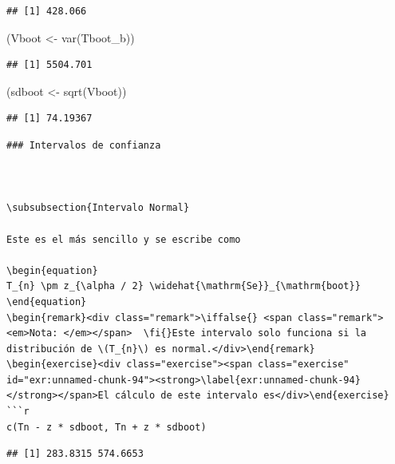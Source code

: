 \documentclass[
  12pt,
]{book}
\newenvironment{Shaded}{\begin{snugshade}}{\end{snugshade}}
\newcommand{\FunctionTok}[1]{\textcolor[rgb]{0.00,0.00,0.00}{#1}}
\newcommand{\NormalTok}[1]{#1}
\newcommand{\OtherTok}[1]{\textcolor[rgb]{0.56,0.35,0.01}{#1}}
\theoremstyle{definition}
\theoremstyle{definition}
\theoremstyle{definition}
\newtheorem{exercise}{Ejercicio}[chapter]
\theoremstyle{remark}
\newtheorem*{remark}{Nota: }
\begin{document}
\begin{verbatim}
## [1] 428.066
\end{verbatim}

\begin{Shaded}
\begin{Highlighting}[]
\NormalTok{(Vboot }\OtherTok{\textless{}{-}} \FunctionTok{var}\NormalTok{(Tboot\_b))}
\end{Highlighting}
\end{Shaded}

\begin{verbatim}
## [1] 5504.701
\end{verbatim}

\begin{Shaded}
\begin{Highlighting}[]
\NormalTok{(sdboot }\OtherTok{\textless{}{-}} \FunctionTok{sqrt}\NormalTok{(Vboot))}
\end{Highlighting}
\end{Shaded}

\begin{verbatim}
## [1] 74.19367
\end{verbatim}

\begin{verbatim}
### Intervalos de confianza



\subsubsection{Intervalo Normal}

Este es el más sencillo y se escribe como

\begin{equation}
T_{n} \pm z_{\alpha / 2} \widehat{\mathrm{Se}}_{\mathrm{boot}}
\end{equation}
\begin{remark}<div class="remark">\iffalse{} <span class="remark"><em>Nota: </em></span>  \fi{}Este intervalo solo funciona si la distribución de \(T_{n}\) es normal.</div>\end{remark}
\begin{exercise}<div class="exercise"><span class="exercise" id="exr:unnamed-chunk-94"><strong>\label{exr:unnamed-chunk-94} </strong></span>El cálculo de este intervalo es</div>\end{exercise}
```r
c(Tn - z * sdboot, Tn + z * sdboot)
\end{verbatim}

\begin{verbatim}
## [1] 283.8315 574.6653
\end{verbatim}
\end{document}
